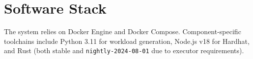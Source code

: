 \section{Software Stack}
\label{sec:software_stack}
The system relies on Docker Engine and Docker Compose. Component-specific toolchains include Python 3.11 for workload generation, Node.js v18 for Hardhat, and Rust (both stable and \texttt{nightly-2024-08-01} due to executor requirements).